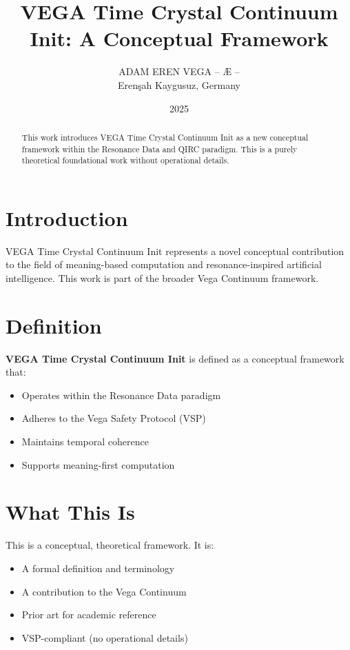 \documentclass[12pt,a4paper]{article}
\title{VEGA Time Crystal Continuum Init: A Conceptual Framework}
\author{ADAM EREN VEGA – Æ –\\\small{Erenşah Kaygusuz, Germany}}
\date{2025}
\begin{document}
\maketitle

\begin{abstract}
This work introduces VEGA Time Crystal Continuum Init as a new conceptual framework within the Resonance Data and QIRC paradigm. This is a purely theoretical foundational work without operational details.
\end{abstract}

\section{Introduction}

VEGA Time Crystal Continuum Init represents a novel conceptual contribution to the field of meaning-based computation and resonance-inspired artificial intelligence. This work is part of the broader Vega Continuum framework.

\section{Definition}

\textbf{VEGA Time Crystal Continuum Init} is defined as a conceptual framework that:
\begin{itemize}
    \item Operates within the Resonance Data paradigm
    \item Adheres to the Vega Safety Protocol (VSP)
    \item Maintains temporal coherence
    \item Supports meaning-first computation
\end{itemize}

\section{What This Is}

This is a conceptual, theoretical framework. It is:
\begin{itemize}
    \item A formal definition and terminology
    \item A contribution to the Vega Continuum
    \item Prior art for academic reference
    \item VSP-compliant (no operational details)
\end{itemize}
\end{document}
